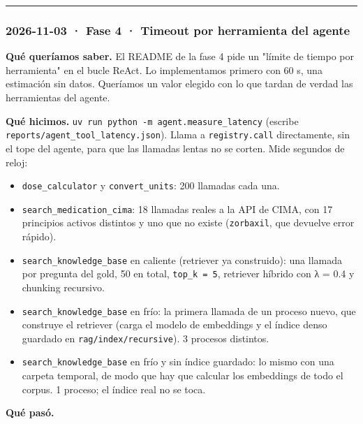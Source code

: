 \begin{center}\rule{0.5\linewidth}{0.5pt}\end{center}

\subsubsection{2026-11-03 · Fase 4 · Timeout por herramienta del agente}

\textbf{Qué queríamos saber.} El README de la fase 4 pide un "límite de tiempo por herramienta" en el
bucle ReAct. Lo implementamos primero con 60 s, una estimación sin datos. Queríamos un valor
elegido con lo que tardan de verdad las herramientas del agente.

\textbf{Qué hicimos.} \texttt{uv run python -m agent.measure\_\allowbreak{}latency} (escribe \texttt{reports/\allowbreak{}agent\_\allowbreak{}tool\_\allowbreak{}latency.json}).
Llama a \texttt{registry.call} directamente, sin el tope del agente, para que las llamadas lentas no se
corten. Mide segundos de reloj:

\begin{itemize}
\tightlist
\item
  \texttt{dose\_\allowbreak{}calculator} y \texttt{convert\_\allowbreak{}units}: 200 llamadas cada una.
\item
  \texttt{search\_\allowbreak{}medication\_\allowbreak{}cima}: 18 llamadas reales a la API de CIMA, con 17 principios activos
  distintos y uno que no existe (\texttt{zorbaxil}, que devuelve error rápido).
\item
  \texttt{search\_\allowbreak{}knowledge\_\allowbreak{}base} en caliente (retriever ya construido): una llamada por pregunta del
  gold, 50 en total, \texttt{top\_\allowbreak{}k =\allowbreak{} 5}, retriever híbrido con λ = 0.4 y chunking recursivo.
\item
  \texttt{search\_\allowbreak{}knowledge\_\allowbreak{}base} en frío: la primera llamada de un proceso nuevo, que construye el
  retriever (carga el modelo de embeddings y el índice denso guardado en \texttt{rag/\allowbreak{}index/\allowbreak{}recursive}).
  3 procesos distintos.
\item
  \texttt{search\_\allowbreak{}knowledge\_\allowbreak{}base} en frío y sin índice guardado: lo mismo con una carpeta temporal, de modo
  que hay que calcular los embeddings de todo el corpus. 1 proceso; el índice real no se toca.
\end{itemize}

\textbf{Qué pasó.}

